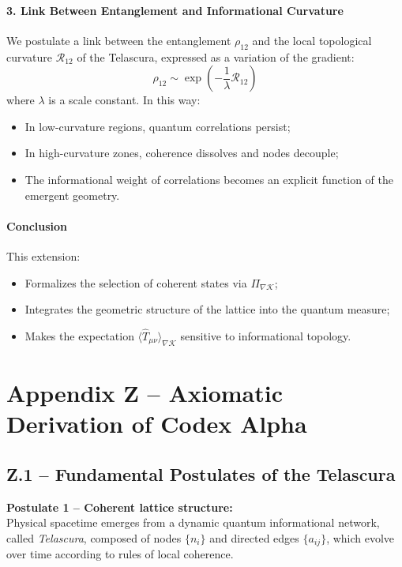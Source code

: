 \documentclass[12pt]{article}
\begin{document}
\paragraph{3. Link Between Entanglement and Informational Curvature}
We postulate a link between the entanglement $\rho_{12}$ and the local topological curvature $\mathcal{R}_{12}$ of the Telascura, expressed as a variation of the gradient:
\[
\rho_{12} \sim \exp\left( - \frac{1}{\lambda} \mathcal{R}_{12} \right)
\]
where $\lambda$ is a scale constant. In this way:
\begin{itemize}
    \item In low-curvature regions, quantum correlations persist;
    \item In high-curvature zones, coherence dissolves and nodes decouple;
    \item The informational weight of correlations becomes an explicit function of the emergent geometry.
\end{itemize}

\paragraph{Conclusion}
This extension:
\begin{itemize}
    \item Formalizes the selection of coherent states via $\Pi_{\nabla \mathcal{K}}$;
    \item Integrates the geometric structure of the lattice into the quantum measure;
    \item Makes the expectation $\langle \widehat{T}_{\mu\nu} \rangle_{\nabla \mathcal{K}}$ sensitive to informational topology.
\end{itemize}
\appendix
\section*{Appendix Z – Axiomatic Derivation of Codex Alpha}

\subsection*{Z.1 – Fundamental Postulates of the Telascura}

\textbf{Postulate 1 – Coherent lattice structure:}\\
Physical spacetime emerges from a dynamic quantum informational network, called \emph{Telascura}, composed of nodes $\{n_i\}$ and directed edges $\{a_{ij}\}$, which evolve over time according to rules of local coherence.
\end{document}
